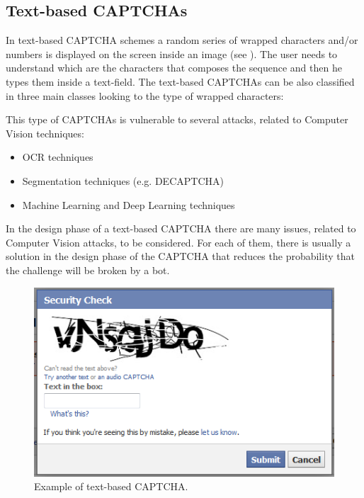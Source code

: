 \subsection{Text-based CAPTCHAs}
In text-based CAPTCHA schemes a random series of wrapped characters and/or numbers is displayed on the screen inside an image (see ). The user needs to understand which are the characters that composes the sequence and then he types them inside a text-field. The text-based CAPTCHAs can be also classified in three main classes looking to the type of wrapped characters:
\begin{itemize}
\end{itemize}
This type of CAPTCHAs is vulnerable to several attacks, related to Computer Vision techniques:
\begin{itemize}
\item{OCR techniques\cite{OCR}}
\item{Segmentation techniques (e.g. DECAPTCHA\cite{DECAPTCHA})}
\item{Machine Learning and Deep Learning techniques}
\end{itemize}
In the design phase of a text-based CAPTCHA there are many issues, related to Computer Vision attacks, to be considered. For each of them, there is usually a solution in the design phase of the CAPTCHA that reduces the probability that the challenge will be broken by a bot\cite{DECAPTCHA}.
\begin{figure}[h]
     \centering
     \includegraphics[width=.55\linewidth]{Images/StateOfArt/text_CAPTCHA}
     \caption{\footnotesize{Example of text-based CAPTCHA.}}\label{soa:text_CAPTCHA}
\end{figure}

